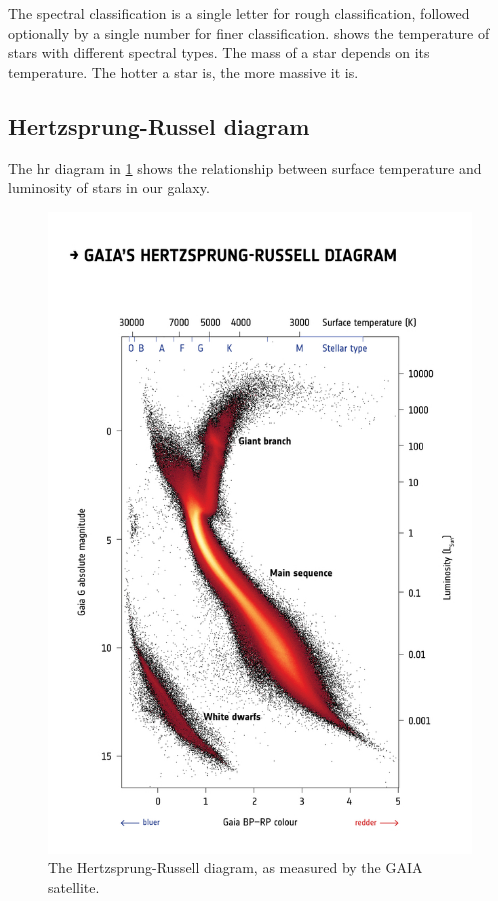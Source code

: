 The spectral classification is a single letter for rough classification, followed optionally by a single number for finer classification.
 shows the temperature of stars with different spectral types. The mass of a star depends on its temperature. The hotter a star is, the more massive it is. 

\subsection{Hertzsprung-Russel diagram}

The \ac{hr} diagram in \cref{fig:hr-gaia} shows the relationship between surface temperature and luminosity of stars in our galaxy.

\begin{figure}
	\includegraphics[width=\textwidth]{img/ch-05/hr-gaia.png}
	\caption{The Hertzsprung-Russell diagram, as measured by the GAIA satellite.}
	\label{fig:hr-gaia}
\end{figure}

